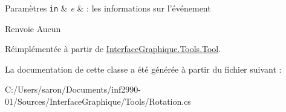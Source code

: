 \begin{DoxyParams}[1]{Paramètres}
\mbox{\tt in}  & {\em e} & \-: les informations sur l'événement\\
\hline
\end{DoxyParams}
\begin{DoxyReturn}{Renvoie}
Aucun 
\end{DoxyReturn}


Réimplémentée à partir de \hyperlink{class_interface_graphique_1_1_tools_1_1_tool_aedd1c93f96ee602475b7cbc3c9c99baa}{Interface\-Graphique.\-Tools.\-Tool}.



La documentation de cette classe a été générée à partir du fichier suivant \-:\begin{DoxyCompactItemize}
\item 
C\-:/\-Users/saron/\-Documents/inf2990-\/01/\-Sources/\-Interface\-Graphique/\-Tools/Rotation.\-cs\end{DoxyCompactItemize}
